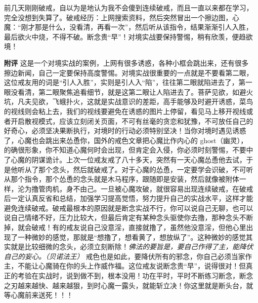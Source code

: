 \begin{case}
    前几天刚刚破戒，自以为是地认为我不会傻到连续破戒，而且一直以来都在学习，完全没想到失算了。破戒经历：上网搜索资料，然后突然冒出一个擦边图，心魔：“刚才那是什么，没看清，再看一次”，然后听从该指令，结果渐渐引人入胜，最后欲火中烧，不得不破。断念贵“早”！对境实战要保持警惕，稍有欣羡，便趋欲境！

    \textbf{附评} 这是一个对境实战的案例，上网有很多诱惑，各种小框会跳出来，还有很多擦边新闻，自己一定要保持高度警惕。对境实战很重要的一点就是不要看第二眼，这位戒友用的词是“引人入胜”，实则是引人入“陷”，往往第二眼就陷进去了，第一眼没看清，第二眼聚焦追看细节，就是这第二眼让人陷进去了。菩萨见欲，如避火坑，凡夫见欲，飞蛾扑火，这就是实战意识的差距，高手能够及时避开诱惑，菜鸟的视线则会粘上去，我们的视线要避免在诱惑的图片上停留，看见马上移开视线或者开启散视模式，应该立刻闭关页面，不可有丝毫的贪恋和犹豫，不可放任自己的好奇心，必须坚决果断执行，对境时的行动必须特别坚决！当你对境时遇见诱惑了，心魔也会跳出来怂恿你，国外的戒色文章把心魔比作内心的 ghost（幽灵），的确很形象，你不知道心魔何时会出现，但肯定会入侵，你必须时刻警惕，不要中了心魔的阴谋诡计。上次一位戒友戒了八十多天，突然有一天心魔怂恿他去试，于是他听从了那个念头，然后就破戒了。对于心魔的怂恿，一定要学会识破，不可听从那个指令，那个怂恿的念头就是木马程序，跟随即是安装，然后就像被附体一样，沦为撸管肉机，身不由己。一旦被心魔攻破，就很容易出现连续破戒，在破戒后一定认真反省和总结，加强学习提高觉悟，努力提升自己的实战水平，这样才能避免连续破戒。破戒最根本的原因就是断念实战不行，你可以说自己无聊，也可以说自己情绪不好，压力比较大，但最后肯定有某种念头驱使你去撸，那种念头不断掉，就会破戒！有的戒友说自己没意淫，直接就撸了，虽然他没意淫，但他心里出现了一种微妙的感觉，那就是“想撸了，想看黄了，想放纵了”。这种微妙的感觉其实就是比较细微的念头，必须立刻断除！\textit{佛法的要旨是，要自己作得了主，能降伏自己的妄心。（贝诺法王）} 戒色也是如此，要降伏所有的邪念，你自己必须当家作主，不能让心魔骑在你的头上作威作福。这位戒友说断念贵“早”，说得很对！但真正的考验在实战时，说到做不到，根本没用！功在平时，平时不断练习断念，断念之刃越来越快、越来越狠，到时心魔一露头，就能斩立决！你这里就是断头台，就等心魔前来送死！！！
\end{case}

